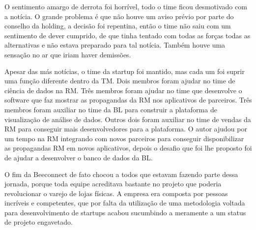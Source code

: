 O sentimento amargo de derrota foi horrível, todo o time ficou desmotivado com a notícia. O grande problema é que não houve um aviso prévio por parte do conselho da holding, a decisão foi repentina, então o time não saiu com um sentimento de dever cumprido, de que tinha tentado com todas as forças todas as alternativas e não estava preparado para tal notícia. Também houve uma sensação no ar que iriam haver demissões.

Apesar das más notícias, o time da startup foi mantido, mas cada um foi suprir uma função diferente dentro da TM. Dois membros foram ajudar no time de ciência de dados na RM. Três membros foram ajudar no time que desenvolve o software que faz mostrar as propagandas da RM nos aplicativos de parceiros. Três membros foram auxiliar no time da BL para construir a plataforma de visualização de análise de dados. Outros dois foram auxiliar no time de vendas da RM para conseguir mais desenvolvedores para a plataforma. O autor ajudou por um tempo na RM integrando com novos parceiros para conseguir disponibilizar as propagandas RM em novos aplicativos, depois o desafio que foi lhe proposto foi de ajudar a desenvolver o banco de dados da BL.

O fim da Beeconnect de fato chocou a todos que estavam fazendo parte dessa jornada, porque toda equipe acreditava bastante no projeto que poderia revolucionar o varejo de lojas físicas. A empresa era composta por pessoas incríveis e competentes, que por falta da utilização de uma metodologia voltada para desenvolvimento de startups acabou sucumbindo a meramente a um status de projeto engavetado.